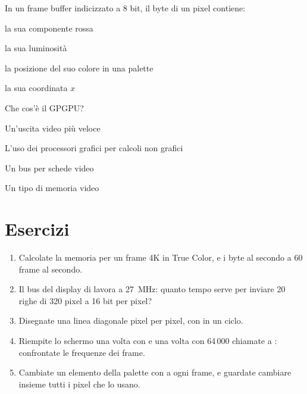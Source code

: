 \begin{quiz}{In un frame buffer indicizzato a 8 bit, il byte di un pixel contiene:}
\item la sua componente rossa
\item la sua luminosità
\item la posizione del suo colore in una palette
\item la sua coordinata $x$
\end{quiz}

\begin{quiz}{Che cos'è il GPGPU?}
\item Un'uscita video più veloce
\item L'uso dei processori grafici per calcoli non grafici
\item Un bus per schede video
\item Un tipo di memoria video
\end{quiz}

\section{Esercizi}

\begin{exercise}
\begin{enumerate}[nosep]
\item Calcolate la memoria per un frame 4K in True Color, e i byte al secondo
  a 60 frame al secondo.
\item Il bus del display di \prg lavora a 27~MHz: quanto tempo serve per
  inviare 20 righe di 320 pixel a 16 bit per pixel?
\item Disegnate una linea diagonale pixel per pixel, con
   in un ciclo.
\item Riempite lo schermo una volta con  e una volta
  con 64\,000 chiamate a : confrontate le frequenze
  dei frame.
\item Cambiate un elemento della palette con  a ogni
  frame, e guardate cambiare insieme tutti i pixel che lo usano.
\end{enumerate}
\end{exercise}


